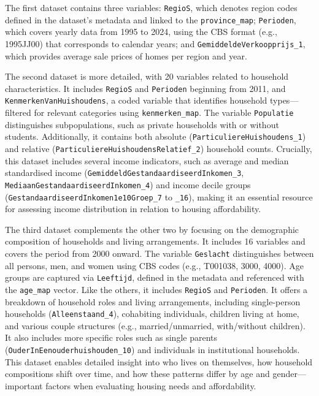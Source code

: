 \documentclass[
]{article}
\begin{document}
The first dataset contains three variables: \texttt{RegioS}, which
denotes region codes defined in the dataset's metadata and linked to the
\texttt{province\_map}; \texttt{Perioden}, which covers yearly data from
1995 to 2024, using the CBS format (e.g., 1995JJ00) that corresponds to
calendar years; and \texttt{GemiddeldeVerkoopprijs\_1}, which provides
average sale prices of homes per region and year.

The second dataset is more detailed, with 20 variables related to
household characteristics. It includes \texttt{RegioS} and
\texttt{Perioden} beginning from 2011, and
\texttt{KenmerkenVanHuishoudens}, a coded variable that identifies
household types---filtered for relevant categories using
\texttt{kenmerken\_map}. The variable \texttt{Populatie} distinguishes
subpopulations, such as private households with or without students.
Additionally, it contains both absolute
(\texttt{ParticuliereHuishoudens\_1}) and relative
(\texttt{ParticuliereHuishoudensRelatief\_2}) household counts.
Crucially, this dataset includes several income indicators, such as
average and median standardised income
(\texttt{GemiddeldGestandaardiseerdInkomen\_3},
\texttt{MediaanGestandaardiseerdInkomen\_4}) and income decile groups
(\texttt{GestandaardiseerdInkomen1e10Groep\_7} to \texttt{\_16}), making
it an essential resource for assessing income distribution in relation
to housing affordability.

The third dataset complements the other two by focusing on the
demographic composition of households and living arrangements. It
includes 16 variables and covers the period from 2000 onward. The
variable \texttt{Geslacht} distinguishes between all persons, men, and
women using CBS codes (e.g., T001038, 3000, 4000). Age groups are
captured via \texttt{Leeftijd}, defined in the metadata and referenced
with the \texttt{age\_map} vector. Like the others, it includes
\texttt{RegioS} and \texttt{Perioden}. It offers a breakdown of
household roles and living arrangements, including single-person
households (\texttt{Alleenstaand\_4}), cohabiting individuals, children
living at home, and various couple structures (e.g., married/unmarried,
with/without children). It also includes more specific roles such as
single parents (\texttt{OuderInEenouderhuishouden\_10}) and individuals
in institutional households. This dataset enables detailed insight into
who lives on themselves, how household compositions shift over time, and
how these patterns differ by age and gender---important factors when
evaluating housing needs and affordability.
\end{document}
